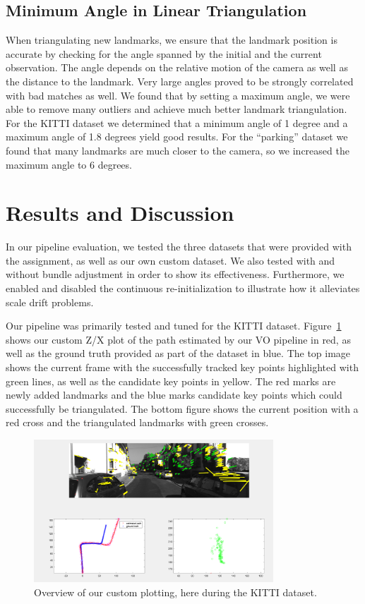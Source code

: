 \documentclass[11pt]{article}
\begin{document}
\subsection{Minimum Angle in Linear Triangulation}
When triangulating new landmarks, we ensure that the landmark position is accurate by checking for the angle spanned by the initial and the current observation. The angle depends on the relative motion of the camera as well as the distance to the landmark.
Very large angles proved to be strongly correlated with bad matches as well. We found that by setting a maximum angle, we were able to remove many outliers and achieve much better landmark triangulation. 
For the KITTI dataset we determined that a minimum angle of 1 degree and a maximum angle of 1.8 degrees yield good results. For the “parking” dataset we found that many landmarks are much closer to the camera, so we increased the maximum angle to 6 degrees.

\section{Results and Discussion}
In our pipeline evaluation, we tested the three datasets that were provided with the assignment, as well as our own custom dataset. We also tested with and without bundle adjustment in order to show its effectiveness. Furthermore, we enabled and disabled the continuous re-initialization to illustrate how it alleviates scale drift problems.

Our pipeline was primarily tested and tuned for the KITTI dataset. Figure~\ref{fig:overview} shows our custom Z/X plot of the path estimated by our VO pipeline in red, as well as the ground truth provided as part of the dataset in blue. The top image shows the current frame with the successfully tracked key points highlighted with green lines, as well as the candidate key points in yellow. The red marks are newly added landmarks and the blue marks candidate key points which could successfully be triangulated. The bottom figure shows the current position with a red cross and the triangulated landmarks with green crosses.

\begin{figure}[!htb]
	\centering
	\includegraphics[width=0.8\textwidth]{images/overview}
	\caption{Overview of our custom plotting, here during the KITTI dataset.}
	\label{fig:overview}
\end{figure}
\end{document}
